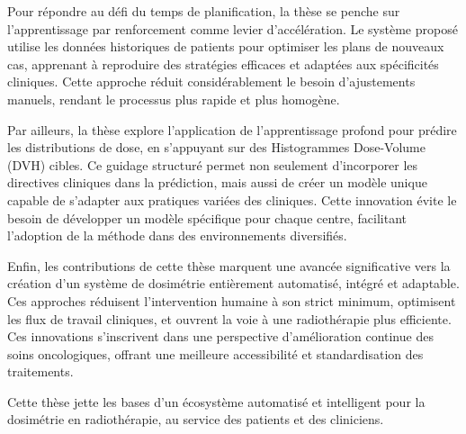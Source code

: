 {	Pour répondre au défi du temps de planification, la thèse se penche sur l’apprentissage par renforcement comme levier d’accélération.
	Le système proposé utilise les données historiques de patients pour optimiser les plans de nouveaux cas, apprenant à reproduire des stratégies efficaces et adaptées aux spécificités cliniques.
	Cette approche réduit considérablement le besoin d’ajustements manuels, rendant le processus plus rapide et plus homogène.
	
	Par ailleurs, la thèse explore l’application de l’apprentissage profond pour prédire les distributions de dose, en s’appuyant sur des Histogrammes Dose-Volume (DVH) cibles.
	Ce guidage structuré permet non seulement d’incorporer les directives cliniques dans la prédiction, mais aussi de créer un modèle unique capable de s’adapter aux pratiques variées des cliniques.
	Cette innovation évite le besoin de développer un modèle spécifique pour chaque centre, facilitant l’adoption de la méthode dans des environnements diversifiés.
	
	Enfin, les contributions de cette thèse marquent une avancée significative vers la création d’un système de dosimétrie entièrement automatisé, intégré et adaptable.
	Ces approches réduisent l’intervention humaine à son strict minimum, optimisent les flux de travail cliniques, et ouvrent la voie à une radiothérapie plus efficiente.
	Ces innovations s’inscrivent dans une perspective d’amélioration continue des soins oncologiques, offrant une meilleure accessibilité et standardisation des traitements.
	
	Cette thèse jette les bases d’un écosystème automatisé et intelligent pour la dosimétrie en radiothérapie, au service des patients et des cliniciens.
}